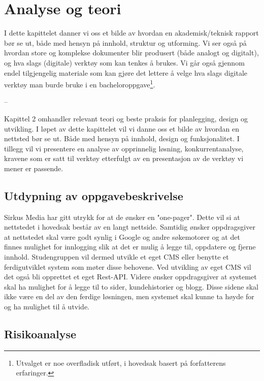 \cleardoublepage
\chapter{Analyse og teori}
\label{chap:analysis}

I dette kapittelet danner vi oss et bilde av hvordan en akademisk/teknisk rapport bør se ut, både med hensyn på innhold, struktur og utforming. Vi ser også på hvordan store og komplekse dokumenter blir produsert (både analogt og digitalt), og hva slags (digitale) verktøy som kan tenkes å brukes. Vi går også gjennom endel tilgjengelig materiale som kan gjøre det lettere å velge hva slags digitale verktøy man burde bruke i en bacheloroppgave\footnote{Utvalget er noe overfladisk utført, i hovedsak basert på forfatterens erfaringer.}.

-- 

Kapittel 2 omhandler relevant teori og beste praksis for planlegging, design og utvikling. I løpet av dette kapittelet vil vi danne oss et bilde av hvordan en nettsted bør se ut. Både med hensyn på innhold, design og funksjonalitet. I tillegg vil vi presentere en analyse av opprinnelig løsning, konkurrentanalyse, kravene som er satt til verktøy etterfulgt av en presentasjon av de verktøy vi mener er passende.

\section{Utdypning av oppgavebeskrivelse}
Sirkus Media har gitt utrykk for at de ønsker en "one-pager". Dette vil si at nettstedet i hovedsak består av en langt nettside. Samtidig ønsker oppdragsgiver at nettstedet skal være godt synlig i Google og andre søkemotorer og at det finnes mulighet for innlogging slik at det er mulig å legge til, oppdatere og fjerne innhold. Studengruppen vil dermed utvikle et eget CMS eller benytte et ferdigutviklet system som møter disse behovene. Ved utvikling av eget CMS vil det også bli opprettet et eget Rest-API. Videre ønsker oppdragsgiver at systemet skal ha mulighet for å legge til to sider, kundehistorier og blogg. Disse sidene skal ikke være en del av den ferdige løsningen, men systemet skal kunne ta høyde for og ha mulighet til å utvide.

\section{Risikoanalyse}

